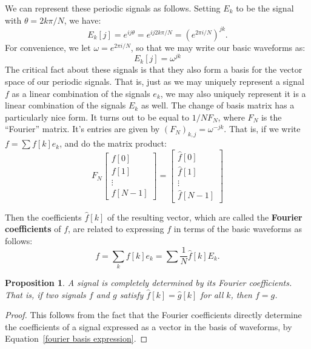 \documentclass[12pt]{report}
\theoremstyle{plain}
\newtheorem{prop}[thm]{Proposition}
\begin{document}
We can represent these periodic signals as follows. Setting $E_k$ to be the signal with $\theta= 2k\pi/N$, we have:
\[E_k[j] = e^{ij\theta} = e^{ij2k\pi/N} = \left(e^{2\pi i / N}\right)^{jk}. \]
For convenience, we let $\omega = e^{2 \pi i / N}$, so that we may write our basic waveforms as:
\[E_k[j] = \omega^{jk} \]
The critical fact about these signals is that they also form a basis for the vector space of our periodic signals. That is, just as we may uniquely represent a signal $f$ as a linear combination of the signals $e_k$, we may also uniquely represent it is a linear combination of the signals $E_k$ as well. The change of basis matrix has a particularly nice form. It turns out to be equal to $1/N F_N$, where $F_N$ is the ``Fourier'' matrix. It's entries are given by $(F_N)_{k,j} = \omega^{-jk}$. That is, if we write $f = \sum f[k] e_k$, and do the matrix product:
\[
F_N
\left[
\begin{matrix}
	f[0] \\
	f[1] \\
	\vdots \\
	f[N-1]
\end{matrix}
\right]
=
\left[
\begin{matrix}
	\hat f[0] \\
	\hat f[1] \\
	\vdots \\
	\hat f[N-1]
\end{matrix}
\right]
\]

Then the coefficients $\hat f[k]$ of the resulting vector, which are called the \textbf{Fourier coefficients} of $f$, are related to expressing $f$ in terms of the basic waveforms as follows:
\begin{equation} \label{fourier basis expression}
f = \sum_k f[k] e_k = \sum \frac 1 N \hat f[k] E_k.
\end{equation}

\begin{prop} \label{fourier coeffs determine}
A signal is completely determined by its Fourier coefficients. That is, if two signals $f$ and $g$ satisfy $\hat f[k] = \hat g[k]$ for all $k$, then $f = g$.
\end{prop}
\begin{proof}
This follows from the fact that the Fourier coefficients directly determine the coefficients of a signal expressed as a vector in the basis of waveforms, by Equation~\ref{fourier basis expression}.
\end{proof}
\end{document}
